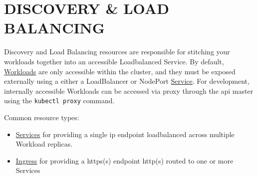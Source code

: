 \section{DISCOVERY \& LOAD BALANCING}

Discovery and Load Balancing resources are responsible for stitching your workloads together into an accessible Loadbalanced Service.  By default,
\href{Workloads}{Workloads} are only accessible within the cluster, and they must be exposed externally using a either
a \textsf{LoadBalancer} or \textsf{NodePort} \href{service-v1-core}{Service}.  For development, internally accessible
Workloads can be accessed via proxy through the api master using the \texttt{kubectl proxy} command.

Common resource types:

\begin{itemize}
	\item \href{service-v1-core}{Services} for providing a single ip endpoint loadbalanced across multiple Workload replicas.
	\item \href{ingress-v1beta1-extensions}{Ingress} for providing a https(s) endpoint http(s) routed to one or more \textsf{Services}
\end{itemize}
